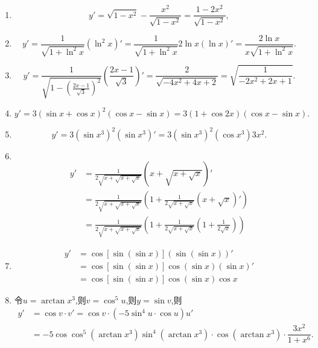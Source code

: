 \begin{solution}
    \begin{enumerate}
        \item $$y'=\sqrt{1-x^2}-\frac{x^2}{\sqrt{1-x^2}} = \frac{1-2x^2}{\sqrt{1-x^2}},$$
        \item $$y' = \frac{1}{\sqrt{1+ \ln^2 x}} \left( \ln^2 x\right)' = \frac{1}{\sqrt{1+ \ln^2 x}}2 \ln x \left( \ln x\right)' = \frac{2 \ln x}{x\sqrt{1+ \ln^2 x}}.$$
        \item $$y' = \frac{1}{\sqrt{1-\left(\frac{2x-1}{\sqrt{3}}\right)^2}} \left( \frac{2x-1}{\sqrt{3}}\right)'=\frac{2}{\sqrt{-4x^2+4x+2}} = \sqrt{\frac{1}{-2x^2+2x+1}}.$$
        \item $$y' = 3(\sin x + \cos x)^2 (\cos x - \sin x) = 3(1+ \cos 2x)( \cos x - \sin x).$$
        \item $$y' = 3 \left( \sin x^3 \right)^2 \left( \sin x^3 \right)' = 3 \left( \sin x^3 \right)^2 \left( \cos x^3 \right) 3x^2.$$
        \item $
              $
              \begin{align*}
                  y' & = \frac{1}{2  \sqrt{x+\sqrt{x+\sqrt{x}}}} \left(  x+\sqrt{x+\sqrt{x}}\right)'                                                \\
                     & = \frac{1}{2  \sqrt{x+\sqrt{x+\sqrt{x}}}} \left(1 + \frac{1}{2\sqrt{x+ \sqrt x}} \left( x + \sqrt{x} \right)' \right)        \\
                     & =  \frac{1}{2  \sqrt{x+\sqrt{x+\sqrt{x}}}} \left(1 + \frac{1}{2\sqrt{x+ \sqrt x}} \left(1+ \frac{1}{2\sqrt x}\right) \right)
              \end{align*}
        \item \begin{align*}
                  y' & = \cos [\sin(\sin x)] \left( \sin(\sin x) \right)'         \\
                     & = \cos [\sin(\sin x)] \cos (\sin x) \left( \sin x \right)' \\
                     & = \cos [\sin(\sin x)] \cos (\sin x) \cos x
              \end{align*}
        \item 令$u = \arctan x^3$,则$v = \cos^5 u$,则$y = \sin v$,则
              \begin{align*}
                  y' & = \cos v \cdot v' = \cos v \cdot (-5 \sin^4 u \cdot \cos u) u'                                          \\
                     & = -5 \cos \cos^5 (\arctan x^3) \sin^4 (\arctan x^3) \cdot \cos (\arctan x^3) \cdot \dfrac{3x^2}{1+x^6}.

\end{align*}
\end{enumerate}
\end{solution}
